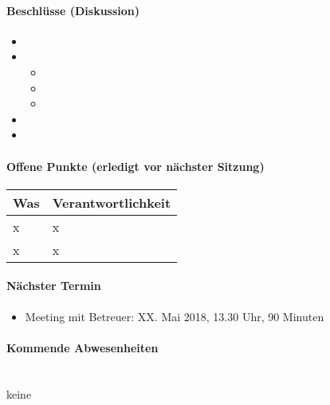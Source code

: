 \paragraph{Beschlüsse (Diskussion)}
\begin{itemize}	
	\item 
	\item 
	\begin{itemize}
		\item 
		\item 
		\item 
	\end{itemize}
	\item 
	\item 
\end{itemize}

\paragraph{Offene Punkte (erledigt vor nächster Sitzung)} \mbox{}

\begin{table}[H]
	\centering
	\begin{tabularx}{\textwidth}{X | p{4.5cm}}
		\rowcolor{gray!50}
		\textbf{Was} & \textbf{Verantwortlichkeit} \\
		\hline
		x & x \\
		x & x \\
	\end{tabularx}
	\label{tab:my-label}
\end{table}

\paragraph{Nächster Termin}
\begin{itemize}	
	\item Meeting mit Betreuer: XX. Mai 2018, 13.30 Uhr, 90 Minuten
\end{itemize}

\paragraph{Kommende Abwesenheiten} \mbox{}\\
keine